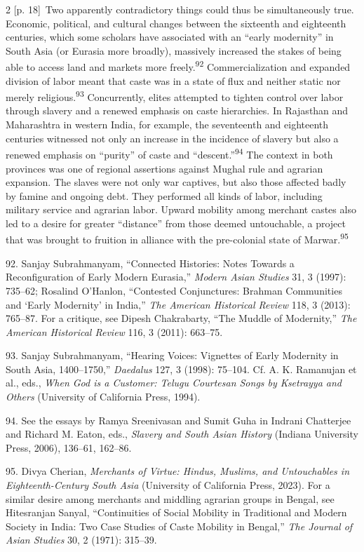 \documentclass[10pt,a4paper]{article}
\begin{document}
\begin{paracol}{2}
\switchcolumn
{\scriptsize\color{gray} [p. 18]}\ Two apparently contradictory things could thus be simultaneously true. Economic, political, and cultural changes between the sixteenth and eighteenth centuries, which some scholars have associated with an “early modernity” in South Asia (or Eurasia more broadly), massively increased the stakes of being able to access land and markets more freely.\nobreak\textsuperscript{92} Commercialization and expanded division of labor meant that caste was in a state of flux and neither static nor merely religious.\nobreak\textsuperscript{93} Concurrently, elites attempted to tighten control over labor through slavery and a renewed emphasis on caste hierarchies. In Rajasthan and Maharashtra in western India, for example, the seventeenth and eighteenth centuries witnessed not only an increase in the incidence of slavery but also a renewed emphasis on “purity” of caste and “descent.”\nobreak\textsuperscript{94} The context in both provinces was one of regional assertions against Mughal rule and agrarian expansion. The slaves were not only war captives, but also those affected badly by famine and ongoing debt. They performed all kinds of labor, including military service and agrarian labor. Upward mobility among merchant castes also led to a desire for greater “distance” from those deemed untouchable, a project that was brought to fruition in alliance with the pre-colonial state of Marwar.\nobreak\textsuperscript{95}\par{\small 92. Sanjay Subrahmanyam, “Connected Histories: Notes Towards a Reconfiguration of Early Modern Eurasia,” \textit{Modern Asian Studies} 31, 3 (1997): 735–62; Rosalind O’Hanlon, “Contested Conjunctures: Brahman Communities and ‘Early Modernity’ in India,” \textit{The American Historical Review} 118, 3 (2013): 765–87. For a critique, see Dipesh Chakrabarty, “The Muddle of Modernity,” \textit{The American Historical Review} 116, 3 (2011): 663–75.\par}{\small 93. Sanjay Subrahmanyam, “Hearing Voices: Vignettes of Early Modernity in South Asia, 1400–1750,” \textit{Daedalus} 127, 3 (1998): 75–104. Cf. A. K. Ramanujan et al., eds., \textit{When God is a Customer: Telugu Courtesan Songs by Ksetrayya and Others} (University of California Press, 1994).\par}{\small 94. See the essays by Ramya Sreenivasan and Sumit Guha in Indrani Chatterjee and Richard M. Eaton, eds., \textit{Slavery and South Asian History} (Indiana University Press, 2006), 136–61, 162–86.\par}{\small 95. Divya Cherian, \textit{Merchants of Virtue: Hindus, Muslims, and Untouchables in Eighteenth-Century South Asia} (University of California Press, 2023). For a similar desire among merchants and middling agrarian groups in Bengal, see Hitesranjan Sanyal, “Continuities of Social Mobility in Traditional and Modern Society in India: Two Case Studies of Caste Mobility in Bengal,” \textit{The Journal of Asian Studies} 30, 2 (1971): 315–39.\par}

\end{paracol}
\end{document}
